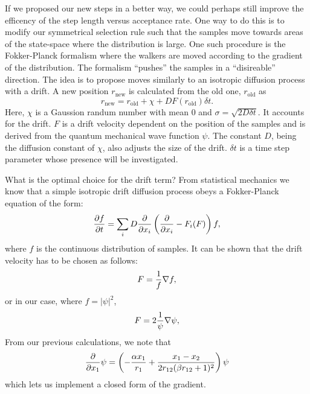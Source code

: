 \documentclass[aps,prc,twocolumn,floatfix]{revtex4}
\begin{document}
 If we proposed our new steps in a better way, we could perhaps still improve the efficency of the step length versus acceptance rate. One way to do this is to modify our symmetrical selection rule such that the samples move towards areas of the state-space where the distribution is large. One such procedure is the Fokker-Planck formalism where the walkers are moved according to the gradient of the distribution. The formalism ``pushes'' the samples in a ``disireable'' direction. The idea is to propose moves similarly to an isotropic diffusion process with a drift. A new position $r_\text{new}$ is calculated from the old one, $r_\text{old}$ as
 \begin{equation}
  r_\text{new} = r_\text{old} + \chi + DF(r_\text{old}) \delta t.
 \end{equation}
Here, $\chi$ is a Gaussion randum number with mean 0 and $\sigma = \sqrt{2D\delta t}$. It accounts for the drift. $F$ is a drift velocity dependent on the position of the samples and is derived from the quantum mechanical wave function $\psi$. The constant $D$, being the diffusion constant of $\chi$, also adjusts the size of the drift. $\delta t$ is a time step parameter whose presence will be investigated. 

What is the optimal choice for the drift term? From statistical mechanics we know that a simple isotropic drift diffusion process obeys a Fokker-Planck equation of the form:
\begin{equation}
 {\partial f \over \partial t} = \sum_i D {\partial \over \partial x_i} \left( {\partial \over \partial x_i} - F_i(F)\right) f,
\end{equation}
where $f$ is the continuous distribution of samples. It can be shown that the drift velocity has to be chosen as follows: 
\begin{equation}
 F = {1 \over f} \nabla f,
\end{equation}
or in our case, where $f = |\psi|^2$, 
\begin{equation}
 F = 2{1\over \psi}\nabla \psi, 
\end{equation}
From our previous calculations, we note that 
\begin{equation}
 {\partial \over \partial x_1}\psi = \left( - {\alpha x_1 \over r_1} + {x_1-x_2 \over 2r_{12}(\beta r_{12} + 1)^2} \right) \psi
\end{equation}
which lets us implement a closed form of the gradient.
\end{document}

